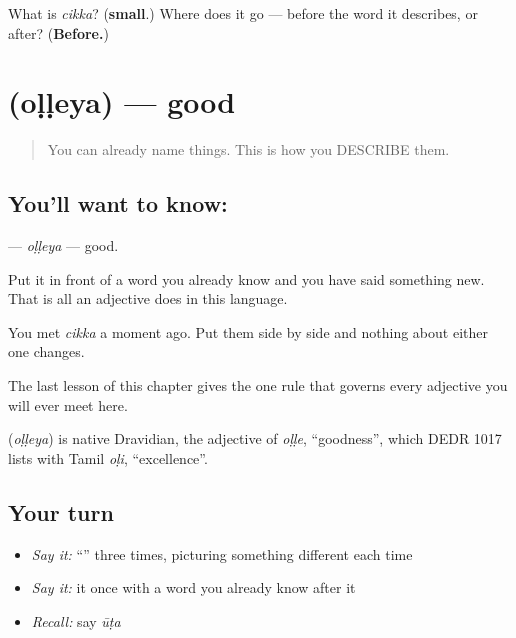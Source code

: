 \begin{tcolorbox}[breakable,colback=teal!4,colframe=teal!35!black,title={Before you move on}]
What is \emph{cikka}? (\textbf{small}.) Where does it go — before the word it describes, or after? (\textbf{Before.})
\end{tcolorbox}
\section[\texorpdfstring{\kn{ಒಳ್ಳೆಯ} (oḷḷeya)}{ಒಳ್ಳೆಯ (oḷḷeya)}]{ (oḷḷeya) — good}

\label{lesson:KA-C42-good}



\begin{quote}
You can already name things. This is how you DESCRIBE them.
\end{quote}

\subsection*{You'll want to know: }
\textbf{} — \emph{oḷḷeya} — good.

Put it in front of a word you already know and you have said something new. That is all an adjective does in this language.

You met \textbf{} \emph{cikka} a moment ago. Put them side by side and nothing about either one changes.

The last lesson of this chapter gives the one rule that governs every adjective you will ever meet here.

\begin{cousinweb}
\textbf{} (\emph{oḷḷeya}) is native Dravidian, the adjective of \emph{oḷḷe}, \textquotedblleft{}goodness\textquotedblright{}, which DEDR 1017 lists with Tamil \emph{oḷi}, \textquotedblleft{}excellence\textquotedblright{}.
\end{cousinweb}

\subsection*{Your turn}
\begin{itemize}
\raggedright
  \item \emph{Say it:} \textquotedblleft{}\textquotedblright{} three times, picturing something different each time
  \item \emph{Say it:} it once with a word you already know after it
  \item \emph{Recall:} say \emph{ūṭa}
\end{itemize}

